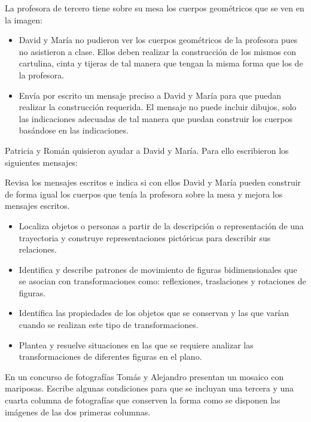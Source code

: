 \ejemplo

La profesora de tercero tiene sobre su mesa los cuerpos geométricos que se ven en la imagen:


\begin{itemize}
  \item David y María no pudieron ver los cuerpos geométricos de la profesora pues no asistieron a clase. Ellos deben realizar la construcción de los mismos con cartulina, cinta y tijeras de tal manera que tengan la misma forma que los de la profesora.
  \item Envía por escrito un mensaje preciso a David y María para que puedan realizar la construcción requerida. El mensaje no puede incluir dibujos, solo las indicaciones adecuadas de tal manera que puedan construir los cuerpos basándose en las indicaciones.
\end{itemize}
Patricia y Román quisieron ayudar a David y María. Para ello escribieron los siguientes mensajes:

Revisa los mensajes escritos e indica si con ellos David y María pueden construir de forma igual los cuerpos que tenía la profesora sobre la mesa y mejora los mensajes escritos.


\evidencias

\begin{itemize}
  \item Localiza objetos o personas a partir de la descripción o representación de una trayectoria y construye representaciones pictóricas para describir sus relaciones.
  \item Identifica y describe patrones de movimiento de figuras bidimensionales que se asocian con transformaciones como: reflexiones, traslaciones y rotaciones de figuras.
  \item Identifica las propiedades de los objetos que se conservan y las que varían cuando se realizan este tipo de transformaciones.
  \item Plantea y resuelve situaciones en las que se requiere analizar las transformaciones de diferentes figuras en el plano.
\end{itemize}

\ejemplo

En un concurso de fotografías Tomás y Alejandro presentan un mosaico con mariposas. Escribe algunas condiciones para que se incluyan una tercera y una cuarta columna de fotografías que conserven la forma como se disponen las imágenes de las dos primeras columnas.

